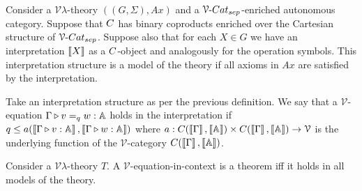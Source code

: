 \documentclass[a4paper,UKenglish,cleveref, autoref, thm-restate]{lipics-v2021}
\begin{document}
\begin{definition}\label{defn:model}
        Consider a $\mathcal{V}\lambda$-theory $((G,\Sigma),Ax)$ and a
        $\VCatSe$-enriched autonomous category. Suppose that $\catC$ has
        binary coproducts enriched over the Cartesian structure of $\VCatSe$.
        Suppose also that for each $X \in G$ we have an interpretation
        $\left \llbracket X \right \rrbracket$ as a $\catC$-object and analogously for the operation
        symbols.  This interpretation structure is a model of the theory if all
        axioms in $Ax$ are satisfied by the interpretation.
\end{definition}

Take an interpretation structure as per the previous definition.  We say that a
$\mathcal{V}$-equation $\Gamma \triangleright v =_q w : \mathbb{A}$ holds in the
interpretation if $q \leq a(\left \llbracket \Gamma \triangleright v : \mathbb{A} \right \rrbracket, \left \llbracket \Gamma \triangleright
w : \mathbb{A} \right \rrbracket)$ where $a : \catC(\sem{\Gamma},\sem{\typeA}) \times
\catC(\sem{\Gamma},\sem{\typeA}) \to \mathcal{V}$ is the underlying function of
the $\mathcal{V}$-category $\catC(\sem{\Gamma},\sem{\typeA})$.


\begin{theorem}
        Consider a $\mathcal{V}\lambda$-theory $T$.  A
        $\mathcal{V}$-equation-in-context is a theorem iff it holds in all
        models of the theory.
\end{theorem}
\end{document}
